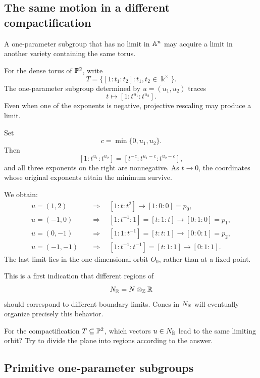 \subsection{The same motion in a different compactification}

A one-parameter subgroup that has no limit in \(\mathbb{A}^n\) may acquire a
limit in another variety containing the same torus.

For the dense torus of \(\mathbb{P}^2\), write
\[
T
=
\{[1:t_1:t_2]:t_1,t_2\in\Bbbk^\times\}.
\]
The one-parameter subgroup determined by \(u=(u_1,u_2)\) traces
\[
t\longmapsto[1:t^{u_1}:t^{u_2}].
\]
Even when one of the exponents is negative, projective rescaling may
produce a limit.

Set
\[
c=\min\{0,u_1,u_2\}.
\]
Then
\[
[1:t^{u_1}:t^{u_2}]
=
[t^{-c}:t^{u_1-c}:t^{u_2-c}],
\]
and all three exponents on the right are nonnegative. As \(t\to0\),
the coordinates whose original exponents attain the minimum survive.

\begin{example}
We obtain:
\[
\begin{aligned}
u=(1,2)
&\quad\Longrightarrow\quad
[1:t:t^2]\longrightarrow[1:0:0]=p_0,
\\
u=(-1,0)
&\quad\Longrightarrow\quad
[1:t^{-1}:1]=[t:1:t]\longrightarrow[0:1:0]=p_1,
\\
u=(0,-1)
&\quad\Longrightarrow\quad
[1:1:t^{-1}]=[t:t:1]\longrightarrow[0:0:1]=p_2,
\\
u=(-1,-1)
&\quad\Longrightarrow\quad
[1:t^{-1}:t^{-1}]=[t:1:1]\longrightarrow[0:1:1].
\end{aligned}
\]
The last limit lies in the one-dimensional orbit \(O_0\), rather than
at a fixed point.
\end{example}

This is a first indication that different regions of
\[
N_{\mathbb{R}}=N\otimes_{\mathbb{Z}}\mathbb{R}
\]
should correspond to different boundary limits. Cones in
\(N_{\mathbb{R}}\) will eventually organize precisely this behavior.

\begin{prediction}
For the compactification \(T\subseteq\mathbb{P}^2\), which vectors
\(u\in N_{\mathbb{R}}\) lead to the same limiting orbit? Try to divide the
plane into regions according to the answer.
\end{prediction}

\subsection{Primitive one-parameter subgroups}

